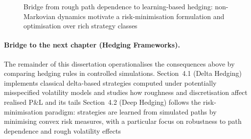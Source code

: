 \documentclass[12pt,a4paper]{article}
\theoremstyle{definition}
\theoremstyle{plain}
\theoremstyle{remark}
\theoremstyle{plain}
\begin{document}
\begin{figure}[H]
\centering
{}
\caption{Bridge from rough path dependence to learning-based hedging: non-Markovian dynamics motivate a risk-minimisation formulation and optimisation over rich strategy classes \cite{FoellmerSchied2016,Buehler2019DeepHedging,Horvath2021DeepRough}}
\label{fig:bridge_to_deep_hedging}
\end{figure}
\FloatBarrier

\paragraph{Bridge to the next chapter (Hedging Frameworks).}
The remainder of this dissertation operationalises the consequences above by comparing hedging rules in controlled simulations.
Section~4.1 (Delta Hedging) implements classical delta-based strategies computed under potentially misspecified volatility models and studies how roughness and discretisation affect realised P\&L and its tails \cite{BlackScholes1973,Heston1993,GatheralRough}
Section~4.2 (Deep Hedging) follows the risk-minimisation paradigm: strategies are learned from simulated paths by minimising convex risk measures, with a particular focus on robustness to path dependence and rough volatility effects \cite{Buehler2019DeepHedging,Horvath2021DeepRough,FoellmerSchied2016}
\end{document}
